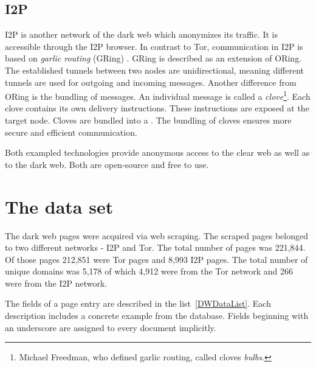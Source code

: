 \subsection{I2P} \label{I2P}
I2P \cite{i2pIntro} is another network of the dark web which anonymizes its traffic. It is accessible through the I2P browser. In contrast to Tor, communication in I2P is based on \textit{garlic routing} (GRing) \cite{garlicRouting}. GRing is described as an extension of ORing. The established tunnels between two nodes are unidirectional, meaning different tunnels are used for outgoing and incoming messages. Another difference from ORing is the bundling of messages. An individual message is called a \textit{clove}\footnote{Michael Freedman, who defined garlic routing, called cloves \textit{bulbs}.}. Each clove contains its own delivery instructions. These instructions are exposed at the target node. Cloves are bundled into a . The bundling of cloves ensures more secure and efficient communication. 

Both exampled technologies provide anonymous access to the clear web as well as to the dark web. Both are open-source and free to use.

\section{The data set} \label{dataSet}
The dark web pages were acquired via web scraping. The scraped pages belonged to two different networks - I2P  and Tor. The total number of pages was 221,844. Of those pages 212,851 were Tor pages and 8,993 I2P pages. The total number of unique domains was 5,178 of which 4,912 were from the Tor network and 266 were from the I2P network. 

The fields of a page entry are described in the list~\ref{DWDataList}. Each description includes a concrete example from the database. Fields beginning with an underscore are assigned to every document implicitly.


